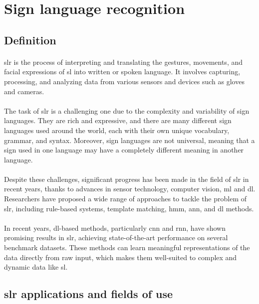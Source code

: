 \section{Sign language recognition}
\subsection{Definition}
\paragraph{}
\ac{slr} is the process of interpreting and translating the gestures, movements, and facial expressions of \ac{sl} into written or spoken language. It involves capturing, processing, and analyzing data from various sensors and devices such as gloves and cameras.
\paragraph{}
The task of \ac{slr} is a challenging one due to the complexity and variability of sign languages. They are rich and expressive, and there are many different sign languages used around the world, each with their own unique vocabulary, grammar, and syntax. Moreover, sign languages are not universal, meaning that a sign used in one language may have a completely different meaning in another language.
\paragraph{}
Despite these challenges, significant progress has been made in the field of \ac{slr} in recent years, thanks to advances in sensor technology, computer vision, \ac{ml} and \ac{dl}. Researchers have proposed a wide range of approaches to tackle the problem of \ac{slr}, including rule-based systems, template matching, \ac{hmm}, \ac{ann}, and \ac{dl} methods.
\paragraph{}
In recent years, \ac{dl}-based methods, particularly \ac{cnn} and \ac{rnn}, have shown promising results in \ac{slr}, achieving state-of-the-art performance on several benchmark datasets. These methods can learn meaningful representations of the data directly from raw input, which makes them well-suited to complex and dynamic data like \ac{sl}.
\subsection{\ac{slr} applications and fields of use}
